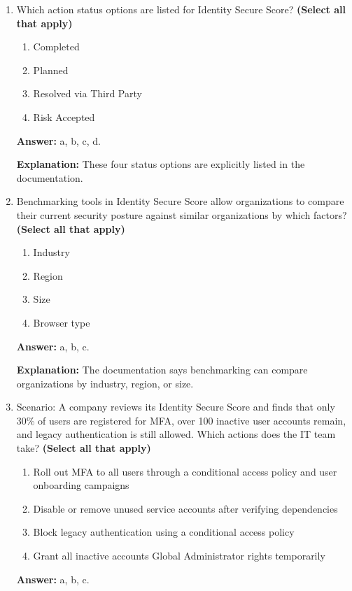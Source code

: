 \documentclass[10pt]{article}
\begin{document}
\begin{enumerate}[leftmargin=*]
\textbf{Answer:} True.

\textbf{Explanation:} The documentation says recommendations are curated, prioritized, and continuously updated.

\item Which action status options are listed for Identity Secure Score? \textbf{(Select all that apply)}
\begin{enumerate}[label=\alph*., leftmargin=1.5em]
\item Completed
\item Planned
\item Resolved via Third Party
\item Risk Accepted
\end{enumerate}
\textbf{Answer:} a, b, c, d.

\textbf{Explanation:} These four status options are explicitly listed in the documentation.

\item Benchmarking tools in Identity Secure Score allow organizations to compare their current security posture against similar organizations by which factors? \textbf{(Select all that apply)}
\begin{enumerate}[label=\alph*., leftmargin=1.5em]
\item Industry
\item Region
\item Size
\item Browser type
\end{enumerate}
\textbf{Answer:} a, b, c.

\textbf{Explanation:} The documentation says benchmarking can compare organizations by industry, region, or size.

\item Scenario: A company reviews its Identity Secure Score and finds that only 30\% of users are registered for MFA, over 100 inactive user accounts remain, and legacy authentication is still allowed. Which actions does the IT team take? \textbf{(Select all that apply)}
\begin{enumerate}[label=\alph*., leftmargin=1.5em]
\item Roll out MFA to all users through a conditional access policy and user onboarding campaigns
\item Disable or remove unused service accounts after verifying dependencies
\item Block legacy authentication using a conditional access policy
\item Grant all inactive accounts Global Administrator rights temporarily
\end{enumerate}
\textbf{Answer:} a, b, c.


\end{enumerate}
\end{document}
